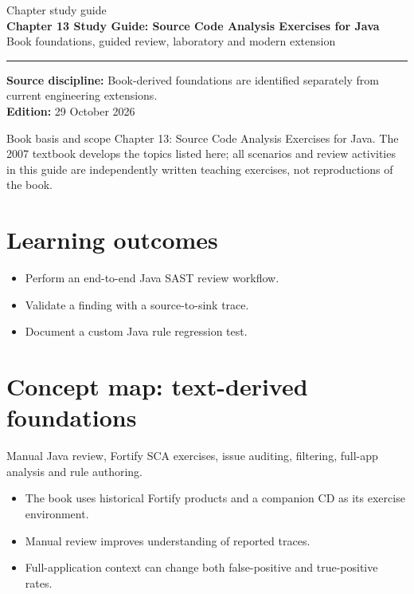 \documentclass[10pt,letterpaper]{article}
\begin{document}
\hypersetup{pageanchor=false}%
\begin{titlepage}
\vspace*{1.0in}
{\color{bluegray}\Large Chapter study guide}\\[1.0em]
{\color{navy}\Huge\bfseries Chapter 13 Study Guide: Source Code Analysis Exercises for Java}\\[0.7em]
{\Large Book foundations, guided review, laboratory and modern extension}\\[2.0em]
\rule{\linewidth}{1.0pt}
\vfill
\textbf{Source discipline:} Book-derived foundations are identified separately from current engineering extensions.\\
\textbf{Edition:} 29 October 2026
\end{titlepage}\hypersetup{pageanchor=true}
\tableofcontents
\clearpage
\begin{focusbox}{Book basis and scope}
Chapter 13: Source Code Analysis Exercises for Java. The 2007 textbook develops the topics listed here; all scenarios and review activities in this guide are independently written teaching exercises, not reproductions of the book.\end{focusbox}
\section{Learning outcomes}
\begin{itemize}
\item Perform an end-to-end Java SAST review workflow.
\item Validate a finding with a source-to-sink trace.
\item Document a custom Java rule regression test.
\end{itemize}

\section{Concept map: text-derived foundations}
Manual Java review, Fortify SCA exercises, issue auditing, filtering, full-app analysis and rule authoring.
\begin{itemize}
\item The book uses historical Fortify products and a companion CD as its exercise environment.
\item Manual review improves understanding of reported traces.
\item Full-application context can change both false-positive and true-positive rates.
\end{itemize}
\end{document}

